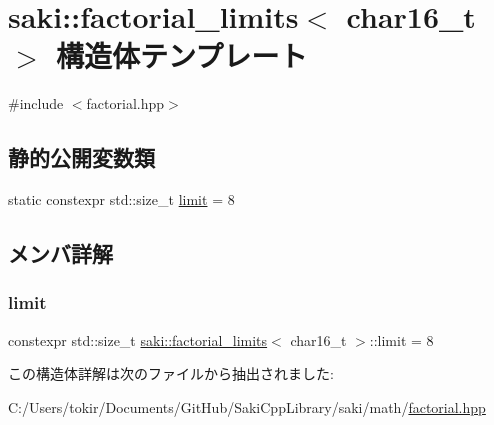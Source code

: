 \hypertarget{structsaki_1_1factorial__limits_3_01char16__t_01_4}{}\section{saki\+:\+:factorial\+\_\+limits$<$ char16\+\_\+t $>$ 構造体テンプレート}
\label{structsaki_1_1factorial__limits_3_01char16__t_01_4}


{\ttfamily \#include $<$factorial.\+hpp$>$}

\subsection*{静的公開変数類}
\begin{DoxyCompactItemize}
\item 
static constexpr std\+::size\+\_\+t \mbox{\hyperlink{structsaki_1_1factorial__limits_3_01char16__t_01_4_a8f9b3d37153ef1155b9bc99e5df3a397}{limit}} = 8
\end{DoxyCompactItemize}


\subsection{メンバ詳解}
\mbox{\label{structsaki_1_1factorial__limits_3_01char16__t_01_4_a8f9b3d37153ef1155b9bc99e5df3a397}} 
\subsubsection{\texorpdfstring{limit}{limit}}
{\footnotesize\ttfamily constexpr std\+::size\+\_\+t \mbox{\hyperlink{structsaki_1_1factorial__limits}{saki\+::factorial\+\_\+limits}}$<$ char16\+\_\+t $>$\+::limit = 8\hspace{0.3cm}{\ttfamily [static]}}



この構造体詳解は次のファイルから抽出されました\+:\begin{DoxyCompactItemize}
\item 
C\+:/\+Users/tokir/\+Documents/\+Git\+Hub/\+Saki\+Cpp\+Library/saki/math/\mbox{\hyperlink{factorial_8hpp}{factorial.\+hpp}}\end{DoxyCompactItemize}
